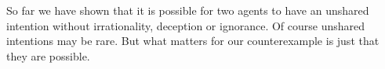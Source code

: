 \documentclass[12pt,\papersize]{extarticle}
\begin{document}
So far we have shown that it is possible for two agents to have an unshared intention without irrationality, deception or ignorance.
Of course unshared intentions may be rare. 
But what matters for our counterexample is just that they are possible. 



%
%
\end{document}
